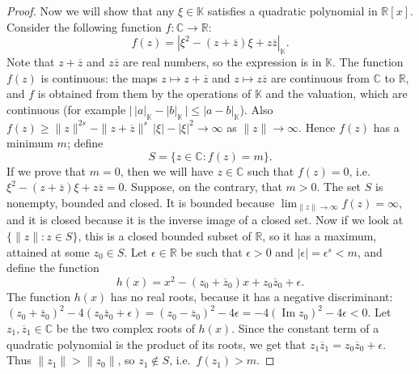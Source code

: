 \documentclass[11pt]{article}
\begin{document}
\begin{proof}
Now we will show that any $\xi \in \mathbb{K}$ satisfies a quadratic polynomial in $\mathbb{R}[x]$. Consider the following function $f : \mathbb{C} \rightarrow \mathbb{R}$:
\[
f(z) = |\xi^2 - (z + \overline{z})\xi + z\overline{z}|_{\mathbb{K}} .
\]
Note that $z + \overline{z}$ and $z\overline{z}$ are real numbers, so the expression is in $\mathbb{K}$. The function $f(z)$ is continuous: the maps $z \mapsto z + \overline{z}$ and $z \mapsto z\overline{z}$ are continuous from $\mathbb{C}$ to $\mathbb{R}$, and $f$ is obtained from them by the operations of $\mathbb{K}$ and the valuation, which are continuous (for example $\big|\,|a|_{\mathbb{K}} - |b|_{\mathbb{K}}\,\big| \leq |a - b|_{\mathbb{K}}$). Also $f(z) \geq \|z\|^{2s} - \|z + \overline{z}\|^s\,|\xi| - |\xi|^2 \rightarrow \infty$ as $\|z\| \rightarrow \infty$. Hence $f(z)$ has a minimum $m$; define
\[
S = \{ z \in \mathbb{C} : f(z) = m \}.
\]
If we prove that $m = 0$, then we will have $z \in \mathbb{C}$ such that $f(z) = 0$, i.e.\ $\xi^2 - (z + \overline{z})\xi + z\overline{z} = 0$. Suppose, on the contrary, that $m > 0$. The set $S$ is nonempty, bounded and closed. It is bounded because $\lim_{\|z\| \rightarrow \infty} f(z) = \infty$, and it is closed because it is the inverse image of a closed set. Now if we look at $\{ \|z\| : z \in S \}$, this is a closed bounded subset of $\mathbb{R}$, so it has a maximum, attained at some $z_0 \in S$. Let $\epsilon \in \mathbb{R}$ be such that $\epsilon > 0$ and $|\epsilon| = \epsilon^s < m$, and define the function
\[
h(x) = x^2 - (z_0 + \overline{z}_0)x + z_0\overline{z}_0 + \epsilon .
\]
The function $h(x)$ has no real roots, because it has a negative discriminant: $(z_0 + \overline{z}_0)^2 - 4(z_0\overline{z}_0 + \epsilon) = (z_0 - \overline{z}_0)^2 - 4\epsilon = -4(\operatorname{Im} z_0)^2 - 4\epsilon < 0$. Let $z_1, \overline{z}_1 \in \mathbb{C}$ be the two complex roots of $h(x)$. Since the constant term of a quadratic polynomial is the product of its roots, we get that $z_1\overline{z}_1 = z_0\overline{z}_0 + \epsilon$. Thus $\|z_1\| > \|z_0\|$, so $z_1 \notin S$, i.e.\ $f(z_1) > m$.


\end{proof}
\end{document}

